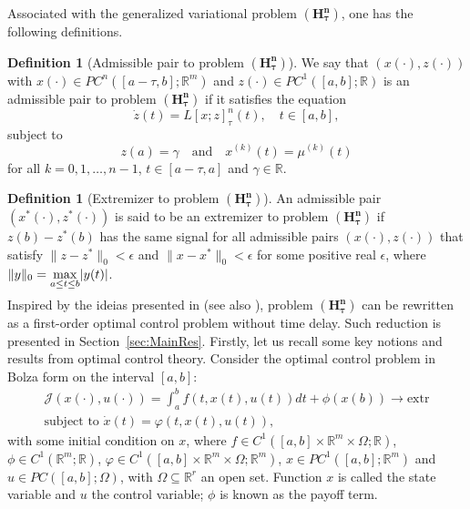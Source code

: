 \documentclass{my-aims}
\theoremstyle{definition}
\newtheorem{definition}[theorem]{Definition}
\begin{document}
Associated with the generalized variational problem $\mathbf{(H_\tau^n)}$,
one has the following definitions.

\begin{definition}[Admissible pair to problem $\mathbf{(H_\tau^n)}$]
We say that $(x(\cdot),z(\cdot))$ with $x(\cdot) \in PC^n([a-\tau,b];\mathbb{R}^m)$
and $z(\cdot) \in PC^1([a,b];\mathbb{R})$ is an admissible pair to problem
$\mathbf{(H_\tau^n)}$ if it satisfies the equation
$$
\dot{z}(t)=L[x;z]^n_\tau(t), \quad t \in [a,b],
$$
subject to
$$
z(a)=\gamma \quad \mbox{and} \quad x^{(k)}(t)=\mu^{(k)}(t)
$$
for all $k=0,1,\dots,n-1$, $t\in [a-\tau,a]$
and $\gamma \in \mathbb{R}$.
\end{definition}

\begin{definition}[Extremizer to problem $\mathbf{(H_\tau^n)}$]
An admissible pair $(x^*(\cdot),z^*(\cdot))$ is said to be an extremizer
to problem $\mathbf{(H_\tau^n)}$ if $z(b)-z^*(b)$ has the same signal for all
admissible pairs $(x(\cdot),z(\cdot))$ that satisfy
$\|z-z^* \|_0< \epsilon$ and $\|x-x^* \|_0< \epsilon$
for some positive real $\epsilon$, where
$\|y\|_0=\smash{\displaystyle\max_{a\leq t \leq b}}|y(t)|$.
\end{definition}

Inspired by the ideias presented in \cite{Guinn}
(see also \cite{MR3177826,MR3124697,MR3531794,MyArt05}), 
problem $\mathbf{(H_\tau^n)}$ can be rewritten as a first-order optimal 
control problem without time delay. Such reduction is presented in 
Section~\ref{sec:MainRes}. Firstly, let us recall some key notions 
and results from optimal control theory.
Consider the optimal control problem in Bolza form  
on the interval $[a,b]$:
\begin{equation}
\label{problem P}
\tag{$P$}
\begin{gathered}
\mathcal{J}(x(\cdot),u(\cdot))=\int_a^b f(t,x(t),u(t))dt
+\phi(x(b))\longrightarrow \mathrm{extr}\\
\text{subject to } \dot{x}(t)=\varphi(t,x(t),u(t)),
\end{gathered}
\end{equation}
with some initial condition on $x$,
where $f \in C^1([a,b]\times \mathbb{R}^{m}\times \Omega;\mathbb{R})$,
$\phi \in C^1(\mathbb{R}^{m};\mathbb{R})$,
$\varphi \in C^1([a,b]\times \mathbb{R}^{m}\times \Omega;\mathbb{R}^m)$,
$x \in PC^1([a,b]; \mathbb{R}^m)$ and $u\in PC([a,b];\Omega)$,
with $\Omega \subseteq \mathbb{R}^r$ an open set.
Function $x$ is called the state variable and $u$ the control variable; 
$\phi$ is known as the payoff term. 
\end{document}
